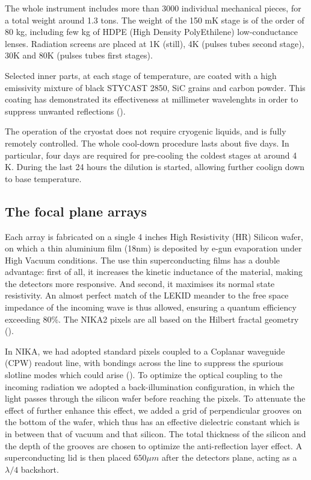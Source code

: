 \documentclass[]{aa} %
\begin{document}
The whole instrument includes more than 3000 individual mechanical pieces, for a total weight around 1.3 tons. The weight of the 150 mK stage is of the order of 80 kg, including few kg of HDPE (High Density PolyEthilene) low-conductance lenses. Radiation screens are placed at 1K (still), 4K (pulses tubes second stage), 30K and 80K (pulses tubes first stages).

Selected inner parts, at each stage of temperature, are coated with a high emissivity mixture of black STYCAST 2850, SiC grains and carbon powder. This coating has demonstrated its effectiveness at millimeter wavelenghts in order to suppress unwanted reflections (\cite{Calvo2010}).

The operation of the cryostat does not require cryogenic liquids, and is fully remotely controlled. The whole cool-down procedure lasts about five days. In particular, four days are required for pre-cooling the coldest stages at around 4 K. During the last 24 hours  the dilution is started, allowing further coolign down to base temperature. 


 \subsection{The focal plane arrays}

Each array is fabricated on a single 4 inches High Resistivity (HR) Silicon wafer, on which a thin aluminium film (18nm) is deposited by e-gun evaporation under High Vacuum conditions. The use thin superconducting films has a double advantage: first of all, it increases the kinetic inductance of the material, making the detectors more responsive. And second, it maximises its normal state resistivity. An almost perfect match of the LEKID meander to the free space impedance of the incoming wave is thus allowed, ensuring a quantum efficiency exceeding 80\%. The NIKA2 pixels are all based on the Hilbert fractal geometry (\cite{Roesch2012}). 

In NIKA, we had adopted standard pixels coupled to a Coplanar waveguide (CPW) readout line, with bondings across the line to suppress the spurious slotline modes which could arise (\cite{Goupy2016}). To optimize the optical coupling to the incoming radiation we adopted a back-illumination configuration, in which the light passes through the silicon wafer before reaching the pixels. To attenuate the effect of  further enhance this effect, we added a grid of perpendicular grooves on the bottom of the wafer, which thus has an effective dielectric constant which is in between that of vacuum and that silicon. The total thickness of the silicon and the depth of the grooves are chosen to optimize the anti-reflection layer effect. A superconducting lid is then placed $650\mu m$ after the detectors plane, acting as a $\lambda/4$ backshort. 
\end{document}
